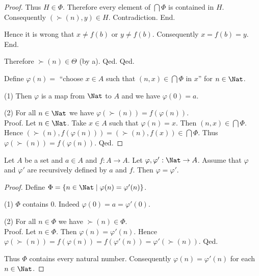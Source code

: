 \documentclass[../arithmetic.tex]{subfiles}
\begin{document}
\begin{forthel}
\begin{proof}
              Thus $H \in \Phi$.
              Therefore every element of $\bigcap \Phi$ is contained in $H$.
              Consequently $(\succ(n),y) \in H$.
              Contradiction.
            End.

            Hence it is wrong that $x \neq f(b)$ or $y \neq f(b)$.
            Consequently $x = f(b) = y$.
          End.

          Therefore $\succ(n) \in \Theta$ (by a).
        Qed.
      Qed.

      Define $\varphi(n) =$ ``choose $x \in A$ such that $(n, x) \in
      \bigcap \Phi$ in $x$'' for $n \in \Nat$.

      (1) Then $\varphi$ is a map from $\Nat$ to $A$ and we have
      $\varphi(0) = a$.

      (2) For all $n \in \Nat$ we have $\varphi(\succ(n)) =
      f(\varphi(n))$. \\
      Proof.
        Let $n \in \Nat$.
        Take $x \in A$ such that $\varphi(n) = x$.
        Then $(n, x) \in \bigcap \Phi$.
        Hence $(\succ(n), f(\varphi(n))) = (\succ(n), f(x)) \in \bigcap \Phi$.
        Thus $\varphi(\succ(n)) = f(\varphi(n))$.
      Qed.
    \end{proof}
  \end{forthel}

  \begin{forthel}
    \begin{proposition}
      Let $A$ be a set and $a \in A$ and $f : A \to A$.
      Let $\varphi, \varphi' : \Nat \to A$.
      Assume that $\varphi$ and $\varphi'$ are recursively defined by $a$ and
      $f$.
      Then $\varphi = \varphi'$.
    \end{proposition}
    \begin{proof}
      Define $\Phi = \{ n \in \Nat \mid \varphi(n) = \varphi'(n) \}$.

      (1) $\Phi$ contains $0$.
      Indeed $\varphi(0) = a = \varphi'(0)$.

      (2) For all $n \in \Phi$ we have $\succ(n) \in \Phi$. \\
      Proof.
        Let $n \in \Phi$.
        Then $\varphi(n) = \varphi'(n)$.
        Hence $\varphi(\succ(n))
          = f(\varphi(n))
          = f(\varphi'(n))
          = \varphi'(\succ(n))$.
      Qed.

      Thus $\Phi$ contains every natural number.
      Consequently $\varphi(n) = \varphi'(n)$ for each $n \in \Nat$.
    \end{proof}
  \end{forthel}
\end{document}
